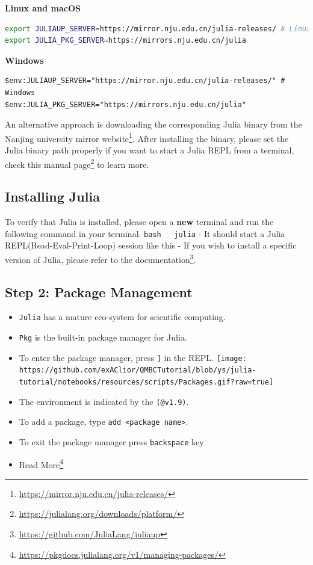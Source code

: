 \documentclass[
  notoc %
]{tufte-book}
\DeclareRobustCommand{\href}[2]{#2\footnote{\url{#1}}}
\providecommand{\tightlist}{%
  \setlength{\itemsep}{0pt}\setlength{\parskip}{0pt}
}
\newcommand{\passthrough}[1]{#1}
\begin{document}
\textbf{Linux and macOS}

\begin{lstlisting}[language=bash]
export JULIAUP_SERVER=https://mirror.nju.edu.cn/julia-releases/ # Linux & macOS
export JULIA_PKG_SERVER=https://mirrors.nju.edu.cn/julia
\end{lstlisting}

\textbf{Windows}

\begin{lstlisting}
$env:JULIAUP_SERVER="https://mirror.nju.edu.cn/julia-releases/" # Windows
$env:JULIA_PKG_SERVER="https://mirrors.nju.edu.cn/julia"
\end{lstlisting}

An alternative approach is downloading the corresponding Julia binary
from the \href{https://mirror.nju.edu.cn/julia-releases/}{Nanjing
university mirror website}. After installing the binary, please set the
Julia binary path properly if you want to start a Julia REPL from a
terminal, check this
\href{https://julialang.org/downloads/platform/}{manual page} to learn
more.

\hypertarget{installing-julia}{%
\subsection{Installing Julia}\label{installing-julia}}

To verify that Julia is installed, please open a \textbf{new} terminal
and run the following command in your terminal.
\passthrough{\lstinline!bash   julia!} - It should start a Julia
REPL(Read-Eval-Print-Loop) session like this - If you wish to install a
specific version of Julia, please refer to the
\href{https://github.com/JuliaLang/juliaup}{documentation}.

\hypertarget{step-2-package-management}{%
\subsection{Step 2: Package
Management}\label{step-2-package-management}}

\begin{itemize}
\tightlist
\item
  \passthrough{\lstinline!Julia!} has a mature eco-system for scientific
  computing.
\item
  \passthrough{\lstinline!Pkg!} is the built-in package manager for
  Julia.
\item
  To enter the package manager, press \passthrough{\lstinline!]!} in the
  REPL.
  \texttt{[image: https://github.com/exAClior/QMBCTutorial/blob/ys/julia-tutorial/notebooks/resources/scripts/Packages.gif?raw=true]}
\item
  The environment is indicated by the \passthrough{\lstinline!(@v1.9)!}.
\item
  To add a package, type \passthrough{\lstinline!add <package name>!}.
\item
  To exit the package manager press \passthrough{\lstinline!backspace!}
  key
\item
  \href{https://pkgdocs.julialang.org/v1/managing-packages/}{Read More}
\end{itemize}
\end{document}
